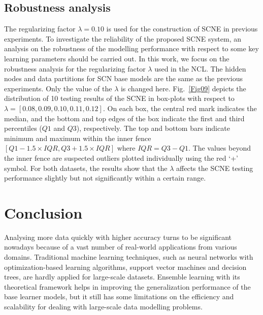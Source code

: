 \documentclass{article}
\begin{document}
\subsection{Robustness analysis}
The regularizing factor $\lambda = 0.10$ is used for the construction of SCNE in previous experiments. 
To investigate the reliability of the proposed SCNE system, an  analysis on the robustness of the modelling performance with respect to some key learning  parameters should be carried out. In this work, we focus on the robustness analysis for the regularizing factor $\lambda$ used in the NCL. 
The hidden nodes and data partitions for SCN base models are the same as the previous experiments.
Only the value of the $\lambda$ is changed here.
Fig.~\ref{Fig09} depicts the distribution of 10 testing results of the SCNE in box-plots with respect to  $\lambda = [0.08, 0.09, 0.10, 0.11, 0.12]$.
On each box, the central red mark indicates the median, and the bottom and top edges of the box indicate the first and third percentiles ($Q1$ and $Q3$), respectively.  
The top and bottom bars indicate minimum and maximum within the inner fence $[Q1-1.5\times IQR, Q3+1.5\times IQR ]$ where $IQR = Q3-Q1$.  
The values beyond the inner fence are suspected outliers plotted individually using the red `+' symbol.
For both datasets, the results show that the $\lambda$ affects the SCNE testing performance slightly but not significantly within a certain range.
 
\section{Conclusion}
Analysing more data quickly with higher accuracy turns to be significant nowadays because of a vast number of real-world applications from various domains.  Traditional machine learning techniques, such as neural networks with optimization-based learning algorithms, support vector machines and decision trees, are hardly applied for large-scale datasets.  Ensemble learning with its theoretical framework helps in  improving the generalization performance of the base learner models, but it still has some limitations on the efficiency and scalability for dealing with large-scale data modelling problems. 
\end{document}
